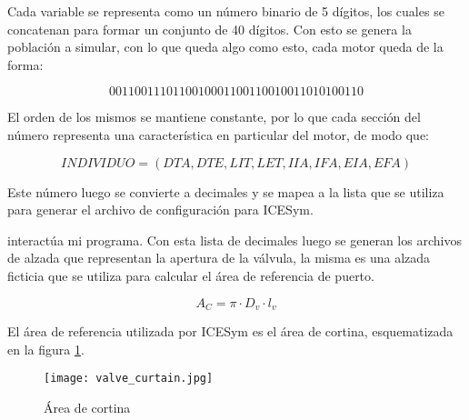 Cada variable se representa como un número binario de 5 dígitos, los cuales se
concatenan para formar un conjunto de 40 dígitos.
%
Con esto se genera la población a simular, con lo que queda algo como esto, cada
motor queda de la forma:

\begin{equation}
  0011001110110010001100110010011010100110 \nonumber
\end{equation}

El orden de los mismos se mantiene constante, por lo que cada sección del número
representa una característica en particular del motor, de modo que:

\begin{equation}
    INDIVIDUO = (DTA, DTE, LIT, LET, IIA, IFA, EIA, EFA) \nonumber
\end{equation}

Este número luego se convierte a decimales y se mapea a la lista que se utiliza
para generar el archivo de configuración para ICESym.
%
%

interactúa mi programa.  Con esta lista de decimales luego se generan los
archivos de alzada que representan la apertura de la válvula, la misma es una
alzada ficticia que se utiliza para calcular el área de referencia de puerto.

\begin{equation}
  A_{C} = \pi \cdot D_{v}\cdot l_{v}
\end{equation}

El área de referencia utilizada por ICESym es el área de cortina, esquematizada
en la figura \ref{fig:area_cortina}.

\begin{figure}
  \centering
  \texttt{[image: valve\_curtain.jpg]}
  \caption{Área de cortina}
  \label{fig:area_cortina}
\end{figure}

